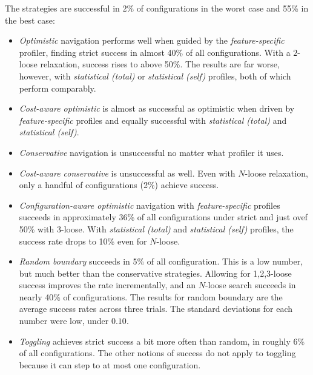 The strategies are successful in 2\% of configurations in the worst case and
55\% in the best case:
\begin{itemize}
  \item
    \emph{Optimistic} navigation performs well when guided by the \emph{feature-specific} profiler,
    finding strict success in almost 40\% of all configurations.
    With a $2$-loose relaxation, success rises to above 50\%.
    The results are far worse, however, with \emph{statistical (total)} or \emph{statistical (self)}
    profiles, both of which perform comparably.

  \item
    \emph{Cost-aware optimistic} is almost as successful as optimistic when driven
    by \emph{feature-specific} profiles and equally successful with \emph{statistical (total)}
    and \emph{statistical (self)}.

  \item
    \emph{Conservative} navigation is unsuccessful no matter what profiler it uses.

  \item
    \emph{Cost-aware conservative} is unsuccessful as well.
    Even with $N$-loose relaxation, only a handful of configurations (2\%) achieve success.

  \item
    \emph{Configuration-aware optimistic} navigation with
    \emph{feature-specific} profiles succeeds in approximately 36\% of all
    configurations under strict and just ovef 50\% with $3$-loose.
    With \emph{statistical (total)} and \emph{statistical (self)} profiles,
    the success rate drops to 10\% even for $N$-loose.

  \item
    \emph{Random boundary} succeeds in 5\% of all configuration.
    This is a low number, but much better than the conservative strategies.
    Allowing for 1,2,3-loose success improves the rate incrementally, and an $N$-loose search
    succeeds in nearly 40\% of configurations.
  \subitem
    The results for random boundary are the average success rates across three trials. The standard deviations
    for each number were low, under $0.10$.

  \item
    \emph{Toggling} achieves strict success a bit more often than random, in roughly 6\% of all configurations.
    The other notions of success do not apply to toggling because it can step to at most one configuration.
\end{itemize}

